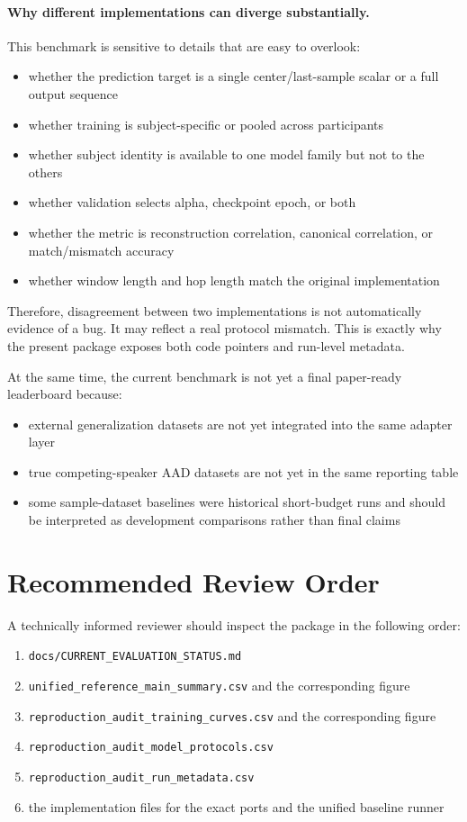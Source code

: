 \documentclass[11pt]{article}
\begin{document}
\paragraph{Why different implementations can diverge substantially.}
This benchmark is sensitive to details that are easy to overlook:
\begin{itemize}
\item whether the prediction target is a single center/last-sample scalar or a full output sequence
\item whether training is subject-specific or pooled across participants
\item whether subject identity is available to one model family but not to the others
\item whether validation selects alpha, checkpoint epoch, or both
\item whether the metric is reconstruction correlation, canonical correlation, or match/mismatch accuracy
\item whether window length and hop length match the original implementation
\end{itemize}
Therefore, disagreement between two implementations is not automatically evidence of a bug. It may reflect a real protocol mismatch. This is exactly why the present package exposes both code pointers and run-level metadata.

At the same time, the current benchmark is not yet a final paper-ready leaderboard because:
\begin{itemize}
\item external generalization datasets are not yet integrated into the same adapter layer
\item true competing-speaker AAD datasets are not yet in the same reporting table
\item some sample-dataset baselines were historical short-budget runs and should be interpreted as development comparisons rather than final claims
\end{itemize}

\section*{Recommended Review Order}
A technically informed reviewer should inspect the package in the following order:
\begin{enumerate}
\item \texttt{docs/CURRENT\_EVALUATION\_STATUS.md}
\item \texttt{unified\_reference\_main\_summary.csv} and the corresponding figure
\item \texttt{reproduction\_audit\_training\_curves.csv} and the corresponding figure
\item \texttt{reproduction\_audit\_model\_protocols.csv}
\item \texttt{reproduction\_audit\_run\_metadata.csv}
\item the implementation files for the exact ports and the unified baseline runner
\end{enumerate}
\end{document}
